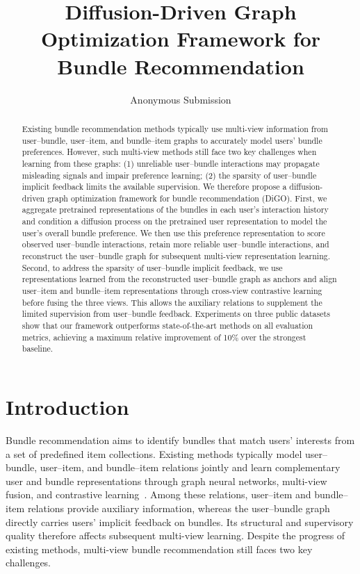 \documentclass[letterpaper]{article}
\title{Diffusion-Driven Graph Optimization Framework for Bundle Recommendation}
\author{
Anonymous Submission
}
\begin{document}
\maketitle


\begin{abstract}
Existing bundle recommendation methods typically use multi-view information from user--bundle, user--item, and bundle--item graphs to accurately model users' bundle preferences. However, such multi-view methods still face two key challenges when learning from these graphs: (1) unreliable user--bundle interactions may propagate misleading signals and impair preference learning; (2) the sparsity of user--bundle implicit feedback limits the available supervision. We therefore propose a diffusion-driven graph optimization framework for bundle recommendation (DiGO). First, we aggregate pretrained representations of the bundles in each user's interaction history and condition a diffusion process on the pretrained user representation to model the user's overall bundle preference. We then use this preference representation to score observed user--bundle interactions, retain more reliable user--bundle interactions, and reconstruct the user--bundle graph for subsequent multi-view representation learning. Second, to address the sparsity of user--bundle implicit feedback, we use representations learned from the reconstructed user--bundle graph as anchors and align user--item and bundle--item representations through cross-view contrastive learning before fusing the three views. This allows the auxiliary relations to supplement the limited supervision from user--bundle feedback. Experiments on three public datasets show that our framework outperforms state-of-the-art methods on all evaluation metrics, achieving a maximum relative improvement of 10\% over the strongest baseline.
\end{abstract}


\section{Introduction}

Bundle recommendation aims to identify bundles that match users'
interests from a set of predefined item collections. Existing
methods typically model user--bundle, user--item, and bundle--item
relations jointly and learn complementary user and bundle
representations through graph neural networks, multi-view fusion,
and contrastive
learning~\cite{bgcn,midgn,crosscbr,bundlegt,ma2024multicbr}.
Among these relations, user--item and bundle--item relations
provide auxiliary information, whereas the user--bundle graph
directly carries users' implicit feedback on bundles. Its
structural and supervisory quality therefore affects subsequent
multi-view learning. Despite the progress of existing methods,
multi-view bundle recommendation still faces two key challenges.
\end{document}
